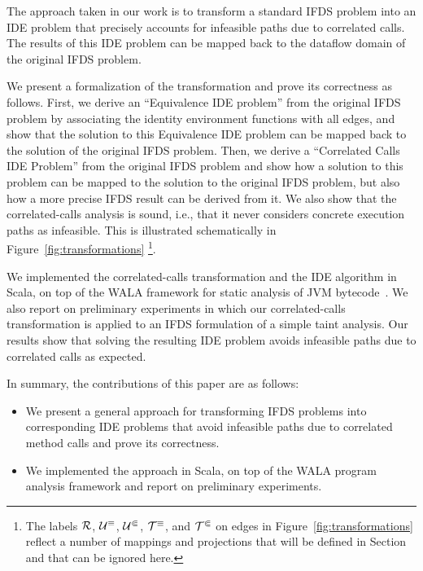 

The approach taken in our work is to transform a standard IFDS problem into an
IDE problem that precisely accounts for infeasible paths due to correlated calls. 
The results of this IDE problem can be mapped back to the dataflow domain of the 
original IFDS problem.

We present a formalization of the transformation and prove its correctness
as follows. First, we derive an ``Equivalence IDE problem''%
from the original 
IFDS problem by associating the identity environment functions with all edges,
and show that the solution to this Equivalence IDE problem can be mapped back
to the solution of the original IFDS problem. Then, we derive a ``Correlated Calls 
IDE Problem'' from the original IFDS problem and show how a solution to this problem 
can be mapped to the solution to the original IFDS problem, but also how a
more precise IFDS result can be derived from it. 
We also show that the correlated-calls analysis is sound, i.e., that it never considers concrete execution paths as infeasible.
This is illustrated schematically
in Figure~\ref{fig:transformations}%
\footnote{ 
  The labels $\mathcal R$, $\mathcal U^\equiv$, $\mathcal U^\Subset$, $\mathcal T^\equiv$, and $\mathcal T^\Subset$ on edges in 
  Figure~\ref{fig:transformations} reflect a number of mappings and projections 
  that will be defined in Section~ and that can be ignored here.
}.  

We implemented the correlated-calls transformation and the IDE algorithm in Scala,
on top of the WALA framework for static analysis of JVM bytecode~\cite{fink2012wala}.
We also report on preliminary experiments in which our correlated-calls transformation
is applied to an IFDS formulation of a simple taint analysis. Our results show that
solving the resulting IDE problem avoids infeasible paths due to correlated calls as
expected.

In summary, the contributions of this paper are as follows:
\begin{itemize}
  \item
    We present a general approach for transforming IFDS problems into corresponding
    IDE problems that avoid infeasible paths due to correlated method calls and
    prove its correctness. 
  \item
    We implemented the approach in Scala, on top of the WALA program analysis framework
    and report on preliminary experiments. 
\end{itemize}

